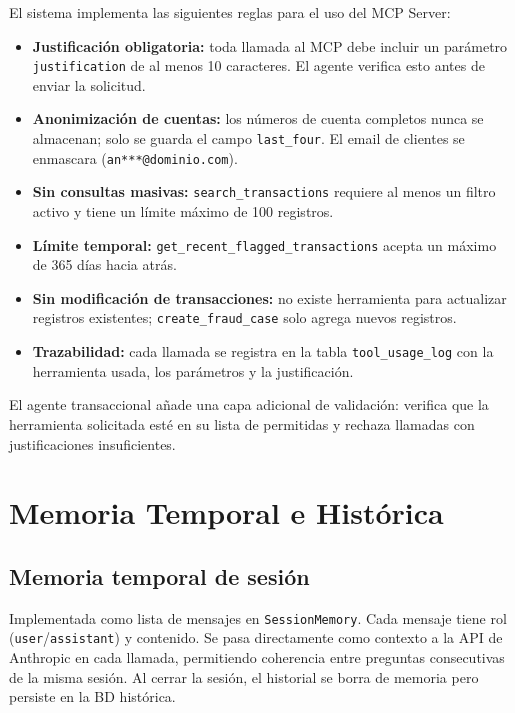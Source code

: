 \documentclass[conference]{IEEEtran}
\begin{document}
El sistema implementa las siguientes reglas para el uso del MCP Server:

\begin{itemize}
  \item \textbf{Justificación obligatoria:} toda llamada al MCP debe incluir un parámetro \texttt{justification} de al menos 10 caracteres. El agente verifica esto antes de enviar la solicitud.
  \item \textbf{Anonimización de cuentas:} los números de cuenta completos nunca se almacenan; solo se guarda el campo \texttt{last\_four}. El email de clientes se enmascara (\texttt{an***@dominio.com}).
  \item \textbf{Sin consultas masivas:} \texttt{search\_transactions} requiere al menos un filtro activo y tiene un límite máximo de 100 registros.
  \item \textbf{Límite temporal:} \texttt{get\_recent\_flagged\_transactions} acepta un máximo de 365 días hacia atrás.
  \item \textbf{Sin modificación de transacciones:} no existe herramienta para actualizar registros existentes; \texttt{create\_fraud\_case} solo agrega nuevos registros.
  \item \textbf{Trazabilidad:} cada llamada se registra en la tabla \texttt{tool\_usage\_log} con la herramienta usada, los parámetros y la justificación.
\end{itemize}

El agente transaccional añade una capa adicional de validación: verifica que la herramienta solicitada esté en su lista de permitidas y rechaza llamadas con justificaciones insuficientes.

\section{Memoria Temporal e Histórica}

\subsection{Memoria temporal de sesión}

Implementada como lista de mensajes en \texttt{SessionMemory}. Cada mensaje tiene rol (\texttt{user}/\texttt{assistant}) y contenido. Se pasa directamente como contexto a la API de Anthropic en cada llamada, permitiendo coherencia entre preguntas consecutivas de la misma sesión. Al cerrar la sesión, el historial se borra de memoria pero persiste en la BD histórica.
\end{document}
